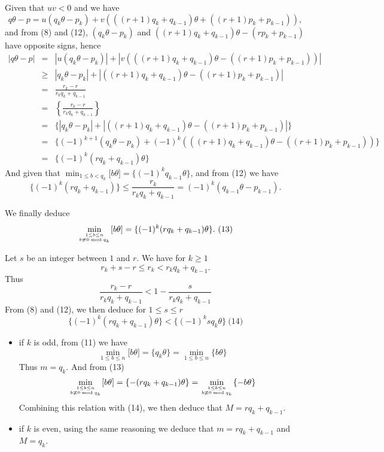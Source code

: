 \documentclass[a4paper,12pt]{article}
\begin{document}
Given that $uv<0$ and we have
\[ q\theta - p = u(q_k\theta - p_k) + v(((r+1)q_k+q_{k-1})\theta +
((r+1)p_k+ p_{k-1})),\]
and from (8) and (12), $(q_k\theta - p_k)$ and $((r+1)q_k+q_{k-1})\theta
- (rp_k + p_{k-1})$ have opposite signs, hence
\begin{eqnarray*}
  |q\theta - p| &=& |u(q_k\theta - p_k)| + |v(((r+1)q_k + q_{k-1})\theta -
  ((r+1)p_k + p_{k-1}))| \\
  &\ge& |q_k \theta - p_k| + |((r+1)q_k + q_{k-1})\theta - ((r+1)p_k +
  p_{k-1})| \\
  &=& \frac{r_k - r}{r_k q_k + q_{k-1}}\\
  &=& \left\{ \frac{r_k - r}{r_k q_k + q_{k-1}}\right\} \\
  &=& \{ |q_k \theta - p_k| + |((r+1)q_k + q_{k-1})\theta - ((r+1)p_k +
  p_{k-1})| \} \\
  &=& \{ (-1)^{k+1}(q_k\theta - p_k) + (-1)^k (((r+1)q_k +
  q_{k-1})\theta - ((r+1) p_k + p_{k-1}))\} \\
  &=& \{ (-1)^k(rq_k + q_{k-1})\theta\}
\end{eqnarray*}
And given that
$\min_{1\le b<q_k}\lbrack b\theta \rbrack = \{(-1)^{k}q_{k-1}\theta\}$,
and from (12) we have
\[ \{(-1)^k(rq_k + q_{k-1}) \} \le \frac{r_k}{r_kq_k + q_{k-1}} =
(-1)^k (q_{k-1}\theta - p_{k-1}).\]

We finally deduce
\[ \min_{1\le b\le n\atop b \not\equiv 0 \bmod{q_k}}\lbrack
b\theta\rbrack = \{(-1)^k(rq_k + q_{k-1})\theta\}.\ (13)\]

Let $s$ be an integer between $1$ and $r$.  We have for $k\ge 1$
\[ r_k + s - r \le r_k < r_k q_k + q_{k-1}.\]
Thus
\[ \frac{r_k - r}{r_k q_k + q_{k-1}} < 1 - \frac{s}{r_k q_k +
  q_{k-1}}\]
From (8) and (12), we then deduce for $1\le s\le r$
\[ \{(-1)^k(r q_k + q_{k-1})\theta\} <
\{(-1)^ksq_k\theta\}\ \mbox{(14)}\]

\begin{itemize}
\item
  if $k$ is odd, from (11) we have
  \[ \min_{1\le b\le n}\lbrack b\theta \rbrack = \{q_k\theta\} =
  \min_{1\le b\le n}\{ b \theta\}\]
  Thus $m = q_k$.  And from (13)
  \[ \min_{1\le b\le n\atop b \not\equiv 0 \bmod{q_k}}\lbrack
  b\theta\rbrack = \{-(rq_k + q_{k-1})\theta\} = \min_{1\le b\le n\atop
    b \not\equiv 0\bmod{q_k}}\{ -b\theta\}\]
  Combining this relation with (14), we then deduce that $M = rq_k +
  q_{k-1}$.

\item
  if $k$ is even, using the same reasoning we deduce that $m = rq_k +
  q_{k-1}$ and $M = q_k$.
\end{itemize}
\end{document}
